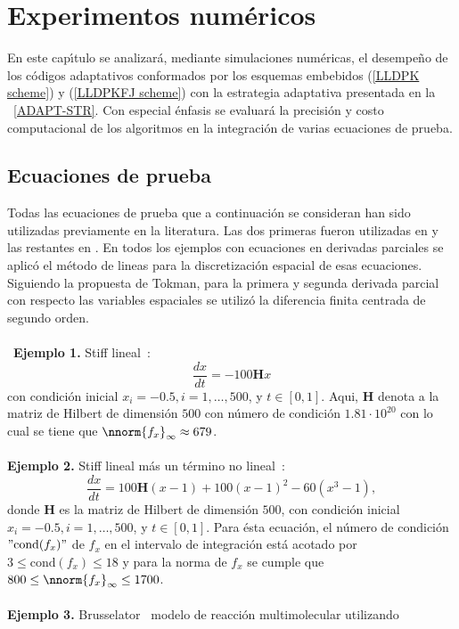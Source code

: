 \chapter{Experimentos numéricos}\label{chapter:SIMULATION}

En este cap\'{\i}tulo se analizará, mediante simulaciones num\'{e}ricas, el
desempeño de los c\'{o}digos adaptativos conformados por los
esquemas embebidos (\ref{LLDPK scheme}) y (\ref{LLDPKFJ scheme}) con la
estrategia adaptativa presentada en la ~\ref{ADAPT-STR}. Con especial énfasis se evaluar\'a la precisi\'on y costo computacional de los algoritmos en la integración de varias ecuaciones de prueba.


\section{Ecuaciones de prueba}
Todas las ecuaciones de prueba que a continuación se consideran han sido utilizadas previamente en la literatura. Las dos primeras fueron utilizadas
en \cite{Jimenez13}  y las restantes en \cite{tokman,loffeld2013comparative}. En todos los ejemplos con ecuaciones en  derivadas parciales se aplicó el método de lineas para la discretización espacial de esas ecuaciones.
Siguiendo la propuesta de Tokman, para la primera y segunda derivada parcial con respecto las variables espaciales se utilizó la diferencia finita centrada de segundo orden.\\ \\
\
\textbf{Ejemplo 1.} Stiff lineal~\cite{Jimenez13}:
\[ \frac{dx}{dt}= -100\mathbf{H}x \]
con condici\'on inicial $x_{i}=-0\mathord{.}5, i=1,\ldots,500$, y $t\in [0,1]$. Aqui, $\mathbf{H}$ denota a la matriz de Hilbert de dimensi\'on $500$ con n\'umero de condici\'on $1\mathord{.}81\cdot 10^{20}$ con lo cual se tiene que  $\nnorm{f_x}_\infty\approx679$. \\ \\
\textbf{Ejemplo 2.} Stiff lineal m\'as un t\'ermino no lineal~\cite{Jimenez13}:
\[ \frac{dx}{dt}= 100\mathbf{H}(x-1)+100(x-1)^{2}-60(x^{3}-1), \]
donde $\mathbf{H}$ es la matriz de Hilbert de dimensi\'on $500$, con   
condici\'on inicial $x_{i}=-0\mathord{.}5,i=1,\ldots,500$, y $t\in [0,1]$. Para ésta ecuación, el número de condici\'on $"\mathrm{cond}(f_x)"$ de $f_x$
en el intervalo de integración está acotado por $3\leq \mathrm{cond}(f_x)\leq 18$ y para la norma de $f_x$ se cumple que $800\leq\nnorm{f_x}_\infty\leq 1700$.\\ \\
\textbf{Ejemplo 3.} Brusselator~\cite{bruss,tokman} modelo de reacci\'on multimolecular utilizando 
